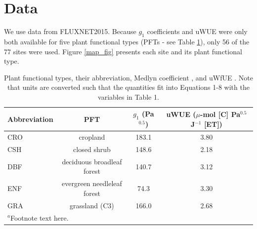 \documentclass[draft,linenumbers]{agujournal}
\begin{document}
\section{Data}

We use data from FLUXNET2015. Because $g_1$ coefficients \citep{Lin_2015} and uWUE were only both available for five plant functional types (PFTs - see Table \ref{pft}),  only 56 of the 77 sites were used. Figure \ref{map_fig}  presents each site and its plant functional type.


\begin{table}
  \label{pft}
\caption{Plant functional types, their abbreviation, Medlyn coefficient \citep[from ][]{Lin_2015}, and uWfUE \citep[from ][]{Zhou_2015}. Note that units are converted such that the quantities fit into Equations 1-8 with the variables in Table 1.}
\centering
\begin{tabular}{l c c c}
  \hline
  Abbreviation & PFT & $g_1$ (Pa$^{0.5}$) & uWUE ($\mu$-mol [C] Pa$^{0.5}$ J$^{-1}$ [ET])  \\
  \hline
  CRO & cropland & 183.1 & 3.80 \\
  CSH & closed shrub & 148.6 & 2.18 \\
  DBF & deciduous broadleaf forest & 140.7 & 3.12 \\
  ENF & evergreen needleleaf forest & 74.3 & 3.30 \\
  GRA & grassland (C3) & 166.0 & 2.68 \\
\hline
\multicolumn{2}{l}{$^{a}$Footnote text here.}
\end{tabular}
\end{table}
\end{document}
